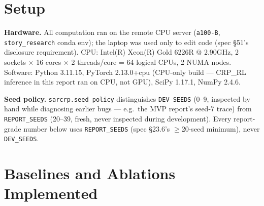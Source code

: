 \documentclass[11pt]{article}
\begin{document}
\section{Setup}

\textbf{Hardware.} All computation ran on the remote CPU server
(\texttt{a100-B}, \texttt{story\_research} conda env); the laptop was used
only to edit code (spec \S51's disclosure requirement). CPU: Intel(R)
Xeon(R) Gold 6226R @ 2.90GHz, 2 sockets $\times$ 16 cores $\times$ 2
threads/core = 64 logical CPUs, 2 NUMA nodes. Software: Python 3.11.15,
PyTorch 2.13.0+cpu (CPU-only build --- CRP\_RL inference in this report ran
on CPU, not GPU), SciPy 1.17.1, NumPy 2.4.6.

\textbf{Seed policy.} \texttt{sarcrp.seed\_policy} distinguishes
\texttt{DEV\_SEEDS} (0--9, inspected by hand while diagnosing earlier bugs
--- e.g.\ the MVP report's seed-7 trace) from \texttt{REPORT\_SEEDS}
(20--39, fresh, never inspected during development). Every report-grade
number below uses \texttt{REPORT\_SEEDS} (spec \S23.6's $\ge$20-seed
minimum), never \texttt{DEV\_SEEDS}.

\section{Baselines and Ablations Implemented}
\label{sec:baselines}
\end{document}
